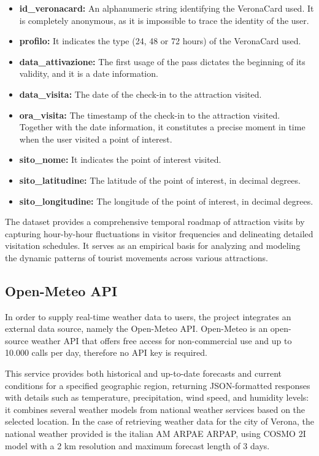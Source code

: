 \begin{itemize}
    \item \textbf{id\_veronacard:} An alphanumeric string identifying the VeronaCard used. It is completely anonymous, as it is impossible to trace the identity of the user.
    \item \textbf{profilo:} It indicates the type (24, 48 or 72 hours) of the VeronaCard used.
    \item \textbf{data\_attivazione:} The first usage of the pass dictates the beginning of its validity, and it is a date information.
    \item \textbf{data\_visita:} The date of the check-in to the attraction visited.
    \item \textbf{ora\_visita:} The timestamp of the check-in to the attraction visited. Together with the date information, it constitutes a precise moment in time when the user visited a point of interest.
    \item \textbf{sito\_nome:} It indicates the point of interest visited.
    \item \textbf{sito\_latitudine:} The latitude of the point of interest, in decimal degrees.
    \item \textbf{sito\_longitudine:} The longitude of the point of interest, in decimal degrees.
\end{itemize}

The dataset provides a comprehensive temporal roadmap of attraction visits by capturing hour-by-hour fluctuations in visitor frequencies and delineating detailed visitation schedules. It serves as an empirical basis for analyzing and modeling the dynamic patterns of tourist movements across various attractions.


\subsection{Open-Meteo API}
\label{sec:open-meteo}

In order to supply real-time weather data to users, the project integrates an external data source, namely the Open-Meteo API. Open-Meteo is an open-source weather API that offers free access for non-commercial use and up to 10.000 calls per day, therefore no API key is required. \cite{openmeteo}

This service provides both historical and up-to-date forecasts and current conditions for a specified geographic region, returning JSON-formatted responses with details such as temperature, precipitation, wind speed, and humidity levels: it combines several weather models from national weather services based on the selected location. In the case of retrieving weather data for the city of Verona, the national weather provided is the italian AM ARPAE ARPAP, using COSMO 2I model with a 2 km resolution and maximum forecast length of 3 days.

